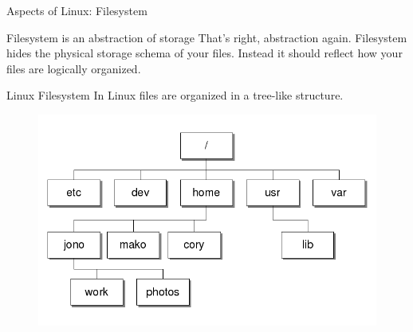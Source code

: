 \begin{frame}{Aspects of Linux: Filesystem}
\begin{block}{Filesystem is an abstraction of storage}
	That's right, abstraction again. Filesystem hides the physical storage schema of your files. Instead it should reflect how your files are logically organized.
\end{block}
\begin{block}{Linux Filesystem}
	In Linux files are organized in a tree-like structure.
	\begin{figure}
		\vspace{-0.2in}
		\centering
		\includegraphics[scale=0.5]{fig/rc2_linuxfs}
	\end{figure}
\end{block}
\end{frame}

